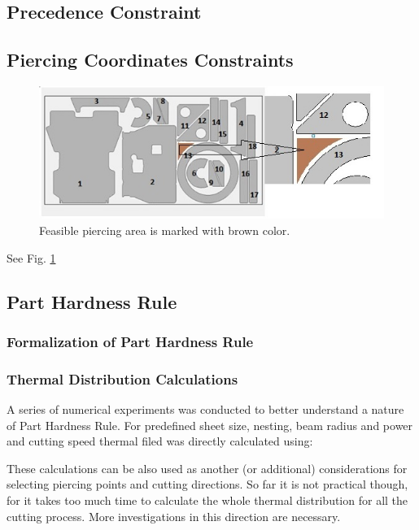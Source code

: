 \documentclass{../download/tPRS2e}
\begin{document}
\subsection{Precedence Constraint}

\subsection{Piercing Coordinates Constraints}

\begin{figure}
\begin{center}
\includegraphics[width=\textwidth]{ppc.jpeg}
\caption{Feasible piercing area is marked with brown color.} \label{piercing-area}
\end{center}
\end{figure}

See Fig. \ref{piercing-area}

\subsection{Part Hardness Rule}

\subsubsection{Formalization of Part Hardness Rule}

\subsubsection{Thermal Distribution Calculations}

A series of numerical experiments was conducted to better understand a nature of Part Hardness Rule.
For predefined sheet size, nesting, beam radius and power and cutting speed thermal filed was directly calculated using:

These calculations can be also used as another (or additional) considerations for selecting piercing points and cutting directions.
So far it is not practical though, for it takes too much time to calculate the whole thermal distribution for all the cutting process.
More investigations in this direction are necessary.
\end{document}
